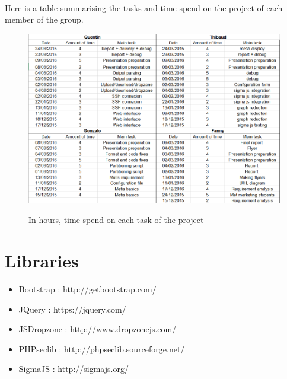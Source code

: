 \documentclass{cranfieldChart}
\begin{document}
\paragraph{}
Here is a table summarising the tasks and time spend on the project of each member of the group.

\begin{figure}[h!]
\centering
\includegraphics[width=1\textwidth]{ressources/workload}
\label{workload}
\caption{In hours, time spend on each task of the project}
\end{figure}

\newpage

\section{Libraries}
\begin{itemize}
\item Bootstrap : http://getbootstrap.com/
\item JQuery : https://jquery.com/
\item JSDropzone : http://www.dropzonejs.com/
\item PHPseclib : http://phpseclib.sourceforge.net/
\item SigmaJS : http://sigmajs.org/
\end{itemize}
\end{document}
